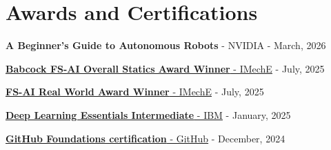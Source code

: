 \documentclass[a4paper,20pt]{article}
\begin{document}
\section{Awards and Certifications}
\begin{description}[font=$\bullet$]
	\item {{\textbf{A Beginner's Guide to Autonomous Robots} - NVIDIA} - March, 2026}
	\vspace{-5pt}
	\item {\href{https://imeche.org/events/formula-student/previous-events/2025-award-winners}{\textbf{Babcock FS-AI Overall Statics Award Winner} - IMechE} - July, 2025}
	\vspace{-5pt}
    \item {\href{https://imeche.org/events/formula-student/previous-events/2025-award-winners}{\textbf{FS-AI Real World Award Winner} - IMechE} - July, 2025}
	\vspace{-5pt}
	\item {\href{https://www.credly.com/badges/dd3240b6-17d3-4841-8749-ca1c196a7bd0/public_url}{\textbf{Deep Learning Essentials Intermediate} - IBM} - January, 2025}
	\vspace{-5pt}
	\item {\href{https://www.credly.com/badges/c1548397-80ef-474f-8cbc-873f5a882eb8/public_url}{\textbf{GitHub Foundations certification} - GitHub} - December, 2024}

\end{description}
\end{document}
